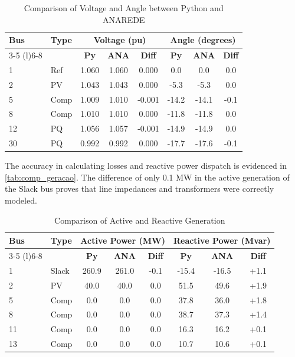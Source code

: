 \documentclass{ieeeaccess}
\begin{document}
\begin{table}[htbp]
\centering
\caption{Comparison of Voltage and Angle between Python and ANAREDE}
\label{tab:comp_tensao}
\begin{tabular}{llcccccc}
\toprule
\multirow{2}{*}{\textbf{Bus}} & \multirow{2}{*}{\textbf{Type}} & \multicolumn{3}{c}{\textbf{Voltage (pu)}} & \multicolumn{3}{c}{\textbf{Angle (degrees)}} \\ \cmidrule(lr){3-5} \cmidrule(l){6-8} 
 &  & \textbf{Py} & \textbf{ANA} & \textbf{Diff} & \textbf{Py} & \textbf{ANA} & \textbf{Diff} \\ \midrule
1 & Ref & 1.060 & 1.060 & 0.000 & 0.0 & 0.0 & 0.0 \\
2 & PV & 1.043 & 1.043 & 0.000 & -5.3 & -5.3 & 0.0 \\
5 & Comp & 1.009 & 1.010 & -0.001 & -14.2 & -14.1 & -0.1 \\
8 & Comp & 1.010 & 1.010 & 0.000 & -11.8 & -11.8 & 0.0 \\
12 & PQ & 1.056 & 1.057 & -0.001 & -14.9 & -14.9 & 0.0 \\
30 & PQ & 0.992 & 0.992 & 0.000 & -17.7 & -17.6 & -0.1 \\ \bottomrule
\end{tabular}
\end{table}

The accuracy in calculating losses and reactive power dispatch is evidenced in \autoref{tab:comp_geracao}. The difference of only 0.1 MW in the active generation of the Slack bus proves that line impedances and transformers were correctly modeled.

\begin{table}[htbp]
\centering
\caption{Comparison of Active and Reactive Generation}
\label{tab:comp_geracao}
\begin{tabular}{llcccccc}
\toprule
\multirow{2}{*}{\textbf{Bus}} & \multirow{2}{*}{\textbf{Type}} & \multicolumn{3}{c}{\textbf{Active Power (MW)}} & \multicolumn{3}{c}{\textbf{Reactive Power (Mvar)}} \\ \cmidrule(lr){3-5} \cmidrule(l){6-8} 
 &  & \textbf{Py} & \textbf{ANA} & \textbf{Diff} & \textbf{Py} & \textbf{ANA} & \textbf{Diff} \\ \midrule
1 & Slack & 260.9 & 261.0 & -0.1 & -15.4 & -16.5 & +1.1 \\
2 & PV & 40.0 & 40.0 & 0.0 & 51.5 & 49.6 & +1.9 \\
5 & Comp & 0.0 & 0.0 & 0.0 & 37.8 & 36.0 & +1.8 \\
8 & Comp & 0.0 & 0.0 & 0.0 & 38.7 & 37.3 & +1.4 \\
11 & Comp & 0.0 & 0.0 & 0.0 & 16.3 & 16.2 & +0.1 \\
13 & Comp & 0.0 & 0.0 & 0.0 & 10.7 & 10.6 & +0.1 \\ \bottomrule
\end{tabular}
\end{table}
\end{document}
